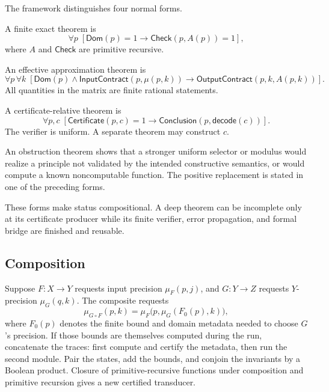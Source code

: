 The framework distinguishes four normal forms.

\begin{definition}
A finite exact theorem is
\[
 \forall p\;[\mathsf{Dom}(p)=1\to\mathsf{Check}(p,A(p))=1],
\]
where \(A\) and \(\mathsf{Check}\) are primitive recursive.
\end{definition}

\begin{definition}
An effective approximation theorem is
\[
 \forall p\,\forall k\;
 [\mathsf{Dom}(p)\wedge\mathsf{InputContract}(p,\mu(p,k))
   \to \mathsf{OutputContract}(p,k,A(p,k))].
\]
All quantities in the matrix are finite rational statements.
\end{definition}

\begin{definition}
A certificate-relative theorem is
\[
 \forall p,c\;[\mathsf{Certificate}(p,c)=1
   \to \mathsf{Conclusion}(p,\mathsf{decode}(c))].
\]
The verifier is uniform.  A separate theorem may construct \(c\).
\end{definition}

\begin{definition}
An obstruction theorem shows that a stronger uniform selector or modulus
would realize a principle not validated by the intended constructive
semantics, or would compute a known noncomputable function.  The positive
replacement is stated in one of the preceding forms.
\end{definition}

These forms make status compositional.  A deep theorem can be incomplete only
at its certificate producer while its finite verifier, error propagation, and
formal bridge are finished and reusable.

\subsection{Composition}

Suppose \(F:X\to Y\) requests input precision \(\mu_F(p,j)\), and
\(G:Y\to Z\) requests \(Y\)-precision \(\mu_G(q,k)\).  The composite requests
\[
 \mu_{G\circ F}(p,k)=
 \mu_F\bigl(p,\mu_G(F_0(p),k)\bigr),
\]
where \(F_0(p)\) denotes the finite bound and domain metadata needed to choose
\(G\)'s precision.  If those bounds are themselves computed during the run,
concatenate the traces: first compute and certify the metadata, then run the
second module.  Pair the states, add the bounds, and conjoin the invariants by
a Boolean product.  Closure of primitive-recursive functions under
composition and primitive recursion gives a new certified transducer.

